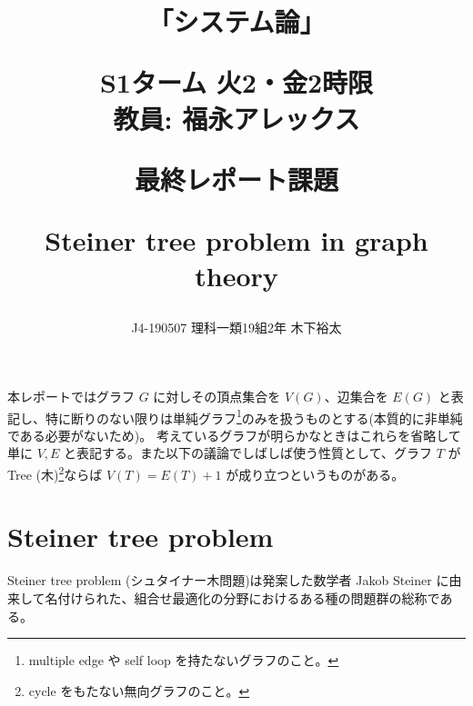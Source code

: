 \documentclass[12pt,uplatex,dvipdfmx,titlepage]{article}
\title
{
    \begin{Large}
        「システム論」
    \end{Large}
    \begin{large}
        S1ターム 火2・金2時限　\\教員: 福永アレックス\\
    \end{large}
    \vspace{15pt}
    \begin{Large}
        最終レポート課題\\
    \end{Large}
    \vspace{20pt}
    \begin{Huge}
    Steiner tree problem in graph theory
    \end{Huge}
    \vspace{100pt}
}
\author{J4-190507 理科一類19組2年 木下裕太}
\theoremstyle{case}
\begin{document}
    \maketitle

    本レポートではグラフ $G$ に対しその頂点集合を $V(G)$、辺集合を $E(G)$ と表記し、特に断りのない限りは単純グラフ\footnote{multiple edge や self loop を持たないグラフのこと。}のみを扱うものとする(本質的に非単純である必要がないため)。
    考えているグラフが明らかなときはこれらを省略して単に $V,E$ と表記する。また以下の議論でしばしば使う性質として、グラフ $T$ が Tree (木)\footnote{cycle をもたない無向グラフのこと。}ならば $V(T)=E(T)+1$ が成り立つというものがある。

    \section{Steiner tree problem}
    Steiner tree problem (シュタイナー木問題)は発案した数学者 Jakob Steiner に由来して名付けられた、組合せ最適化の分野におけるある種の問題群の総称である。
\end{document}

